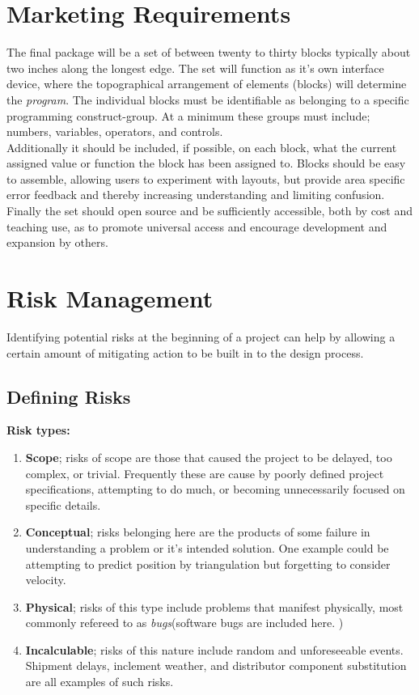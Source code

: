 \section{Marketing Requirements}


The final package will be a set of between twenty to thirty blocks typically about two inches along the longest edge. The set will function as it's own interface device, where the topographical arrangement of elements (blocks) will determine the \textit{program}. The individual blocks must be identifiable as belonging to a specific programming construct-group. At a minimum these groups must include; numbers, variables, operators, and controls.\\

Additionally it should be included, if possible, on each block, what the current assigned value or function the block has been assigned to. Blocks should be easy to assemble,  allowing users to experiment with layouts, but provide area specific error feedback and thereby increasing understanding and limiting confusion. \\

Finally the set should open source and be sufficiently accessible, both by cost and teaching use, as to promote universal access and encourage development and expansion by others.



\section{Risk Management}
Identifying potential risks  at the beginning of a project can help by allowing a certain amount of mitigating action to be built in to the design process.
\subsection{Defining Risks} 
 
 \hspace{.35cm} \textbf{Risk types:}
 \begin{enumerate}
 \item \textbf{Scope}; risks of scope are those that caused the project to be delayed, too complex, or trivial. Frequently these are cause by poorly defined project specifications, attempting to do much, or becoming unnecessarily focused on specific details.
 \item \textbf{Conceptual}; risks belonging here are the products of some failure in understanding a problem or it's intended solution. One example could be  attempting to predict position by triangulation but forgetting to consider velocity. 
 \item \textbf{Physical}; risks of this type include problems that manifest physically, most commonly refereed to as \textit{bugs}(software bugs are included here. )
 \item \textbf{Incalculable}; risks of this nature include random and unforeseeable events. Shipment delays, inclement weather, and distributor component substitution are all examples of such risks.
 \end{enumerate}
